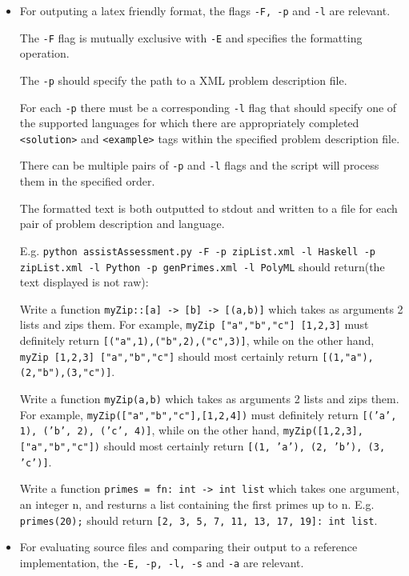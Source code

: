 \documentclass[a4paper,12pt]{article}
\begin{document}
\begin{itemize}
 
 \item 

 For outputing a latex friendly format, the flags \texttt{-F, -p} and \texttt{-l} are relevant. 

 The \texttt{-F} flag is mutually exclusive with \texttt{-E} and specifies the formatting operation. 

 The \texttt{-p} should specify the path to a XML problem description file. 

 For each \texttt{-p} there must be a corresponding \texttt{-l} flag that should specify one of the supported languages for which there are appropriately completed \texttt{<solution>} and \texttt{<example>} tags within the specified problem description file.

 There can be multiple pairs of \texttt{-p} and \texttt{-l} flags and the script will process them in the specified order.
 
 The formatted text is both outputted to stdout and written to a file for each pair of problem description and language.
 
 E.g. \texttt{python assistAssessment.py -F -p zipList.xml -l Haskell -p zipList.xml -l Python -p genPrimes.xml -l PolyML} should return(the text displayed is not raw):
 
 Write a function \texttt{myZip::[a] -> [b] -> [(a,b)]} which takes as arguments 2 lists and zips them. For example, \texttt{myZip ["a","b","c"] [1,2,3]} must definitely return \texttt{[("a",1),("b",2),("c",3)]}, while on the other hand, \texttt{myZip [1,2,3] ["a","b","c"]} should most certainly return \texttt{[(1,"a"),(2,"b"),(3,"c")]}.

Write a function \texttt{myZip(a,b)} which takes as arguments 2 lists and zips them. For example, \texttt{myZip(["a","b","c"],[1,2,4])} must definitely return \texttt{[('a', 1), ('b', 2), ('c', 4)]}, while on the other hand, \texttt{myZip([1,2,3],["a","b","c"])} should most certainly return \texttt{[(1, 'a'), (2, 'b'), (3, 'c')]}.

Write a function \texttt{primes = fn: int -> int list} which takes one argument, an integer n, and resturns a list containing the first primes up to n. E.g. \texttt{primes(20);} should return \texttt{[2, 3, 5, 7, 11, 13, 17, 19]: int list}.
 
 
 \item
 
 For evaluating source files and comparing their output to a reference implementation, the \texttt{-E, -p, -l, -s} and \texttt{-a} are relevant.
 

\end{itemize}
\end{document}
